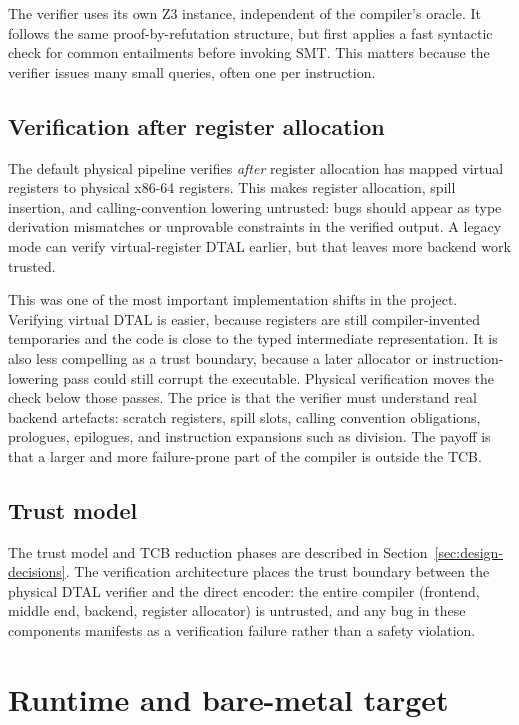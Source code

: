 The verifier uses its own Z3 instance, independent of the compiler's oracle. It follows the same proof-by-refutation structure, but first applies a fast syntactic check for common entailments before invoking SMT. This matters because the verifier issues many small queries, often one per instruction.

\subsection{Verification after register allocation}

The default physical pipeline verifies \textit{after} register allocation has mapped virtual registers to physical x86-64 registers. This makes register allocation, spill insertion, and calling-convention lowering untrusted: bugs should appear as type derivation mismatches or unprovable constraints in the verified output. A legacy mode can verify virtual-register DTAL earlier, but that leaves more backend work trusted.

This was one of the most important implementation shifts in the project. Verifying virtual DTAL is easier, because registers are still compiler-invented temporaries and the code is close to the typed intermediate representation. It is also less compelling as a trust boundary, because a later allocator or instruction-lowering pass could still corrupt the executable. Physical verification moves the check below those passes. The price is that the verifier must understand real backend artefacts: scratch registers, spill slots, calling convention obligations, prologues, epilogues, and instruction expansions such as division. The payoff is that a larger and more failure-prone part of the compiler is outside the TCB.

\subsection{Trust model}

The trust model and TCB reduction phases are described in Section~\ref{sec:design-decisions}. The verification architecture places the trust boundary between the physical DTAL verifier and the direct encoder: the entire compiler (frontend, middle end, backend, register allocator) is untrusted, and any bug in these components manifests as a verification failure rather than a safety violation.

\section{Runtime and bare-metal target}\label{sec:runtime}

